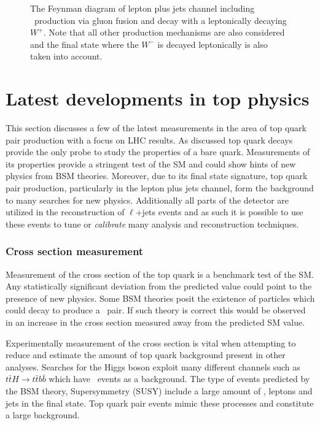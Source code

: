 {\begin{figure}[htbp]
  \centering
  \begin{minipage}[][][t]{.60\textwidth}
  
  \end{minipage}
  \caption{The Feynman diagram of lepton plus jets channel including \ttbar\ production via gluon fusion and decay with a leptonically decaying $W^+$. Note that all other production mechanisms are also considered and the final state where the $W^-$ is decayed leptonically is also taken into account.} \label{fig:TopQuarkFullLPlusJets}
\end{figure}

\section{Latest developments in top physics}

This section discusses a few of the latest measurements in the area of top quark pair production with a focus on LHC results. As discussed top quark decays provide the only probe to study the properties of a bare quark. Measurements of its properties provide a stringent test of the SM and could show hints of new physics from BSM theories. Moreover, due to its final state signature, top quark pair production, particularly in the lepton plus jets channel, form the background to many searches for new physics. Additionally all parts of the detector are utilized in the reconstruction of $\ell$+jets events and as such it is possible to use these events to tune or \textit{calibrate} many analysis and reconstruction techniques.

\subsubsection{Cross section measurement}

Measurement of the cross section of the top quark is a benchmark test of the SM. Any statistically significant deviation from the predicted value could point to the presence of new physics. Some BSM theories posit the existence of particles which could decay to produce a \ttbar\ pair. If such theory is correct this would be observed in an increase in the cross section measured away from the predicted SM value.

Experimentally measurement of the cross section is vital when attempting to reduce and estimate the amount of top quark background present in other analyses. Searches for the Higgs boson exploit many different channels such as $t\bar{t}H\rightarrow t\bar{t}b\bar{b}$ which have \ttbar\ events as a background. The type of events predicted by the BSM theory, Supersymmetry (SUSY) include a large amount of \met, leptons and jets in the final state. Top quark pair events mimic these processes and constitute a large background.

}
